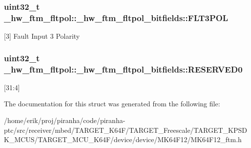 \subsubsection[{\texorpdfstring{F\+L\+T3\+P\+OL}{FLT3POL}}]{\setlength{\rightskip}{0pt plus 5cm}uint32\+\_\+t \+\_\+hw\+\_\+ftm\+\_\+fltpol\+::\+\_\+hw\+\_\+ftm\+\_\+fltpol\+\_\+bitfields\+::\+F\+L\+T3\+P\+OL}\hypertarget{struct__hw__ftm__fltpol_1_1__hw__ftm__fltpol__bitfields_ade6c79f3006c4cade0516fc10b889090}{}\label{struct__hw__ftm__fltpol_1_1__hw__ftm__fltpol__bitfields_ade6c79f3006c4cade0516fc10b889090}
\mbox{[}3\mbox{]} Fault Input 3 Polarity 
\subsubsection[{\texorpdfstring{R\+E\+S\+E\+R\+V\+E\+D0}{RESERVED0}}]{\setlength{\rightskip}{0pt plus 5cm}uint32\+\_\+t \+\_\+hw\+\_\+ftm\+\_\+fltpol\+::\+\_\+hw\+\_\+ftm\+\_\+fltpol\+\_\+bitfields\+::\+R\+E\+S\+E\+R\+V\+E\+D0}\hypertarget{struct__hw__ftm__fltpol_1_1__hw__ftm__fltpol__bitfields_a159b7c02bde0d47f2186137e05b84b39}{}\label{struct__hw__ftm__fltpol_1_1__hw__ftm__fltpol__bitfields_a159b7c02bde0d47f2186137e05b84b39}
\mbox{[}31\+:4\mbox{]} 

The documentation for this struct was generated from the following file\+:\begin{DoxyCompactItemize}
\item 
/home/erik/proj/piranha/code/piranha-\/ptc/src/receiver/mbed/\+T\+A\+R\+G\+E\+T\+\_\+\+K64\+F/\+T\+A\+R\+G\+E\+T\+\_\+\+Freescale/\+T\+A\+R\+G\+E\+T\+\_\+\+K\+P\+S\+D\+K\+\_\+\+M\+C\+U\+S/\+T\+A\+R\+G\+E\+T\+\_\+\+M\+C\+U\+\_\+\+K64\+F/device/device/\+M\+K64\+F12/M\+K64\+F12\+\_\+ftm.\+h\end{DoxyCompactItemize}
